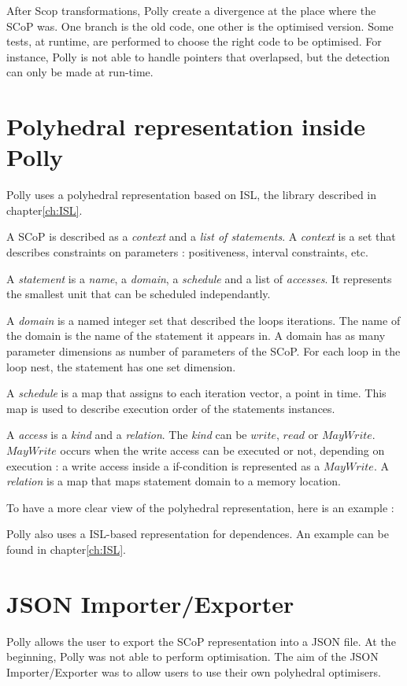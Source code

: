 After Scop transformations, Polly create a divergence at the place where the SCoP was. One branch is the old code, one other is the optimised version. Some tests, at runtime, are performed to choose the right code to be optimised. For instance, Polly is not able to handle pointers that overlapsed, but the detection can only be made at run-time.

\section{Polyhedral representation inside Polly}
Polly uses a polyhedral representation based on ISL, the library described in chapter\ref{ch:ISL}.

A SCoP is described as a \emph{context} and a \emph{list of statements}. A \emph{context} is a set that describes constraints on parameters : positiveness, interval constraints, etc.

A \emph{statement} is a \emph{name}, a \emph{domain}, a \emph{schedule} and a list of \emph{accesses}. It represents the smallest unit that can be scheduled independantly.

A \emph{domain} is a named integer set that described the loops iterations. The name of the domain is the name of the statement it appears in. A domain has as many parameter dimensions as number of parameters of the SCoP. For each loop in the loop nest, the statement has one set dimension.

A \emph{schedule} is a map that assigns to each iteration vector, a point in time. This map is used to describe execution order of the statements instances.

A \emph{access} is a \emph{kind} and a \emph{relation}. The \emph{kind} can be $write$, $read$ or $MayWrite$. $MayWrite$ occurs when the write access can be executed or not, depending on execution : a write access inside a if-condition is represented as a $MayWrite$. A \emph{relation} is a map that maps statement domain to a memory location. 

To have a more clear view of the polyhedral representation, here is an example :

Polly also uses a ISL-based representation for dependences. An example can be found in chapter\ref{ch:ISL}.

\section{JSON Importer/Exporter}
Polly allows the user to export the SCoP representation into a JSON file. At the beginning, Polly was not able to perform optimisation. The aim of the JSON Importer/Exporter was to allow users to use their own polyhedral optimisers. 

